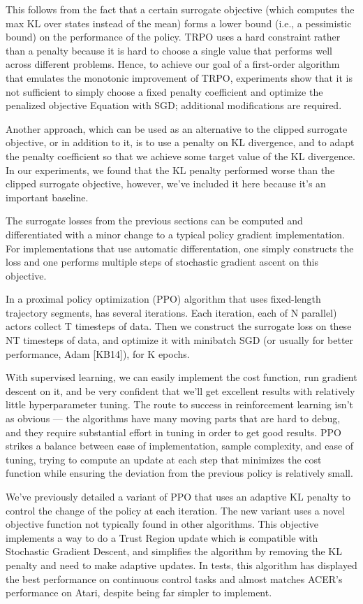 \documentclass[conference]{IEEEtran}
\begin{document}
This follows from the fact that a certain surrogate objective (which computes the max KL over states instead of the mean) forms a lower bound (i.e., a pessimistic bound) on the performance of the policy. TRPO uses a hard constraint rather than a penalty because it is hard to choose a single value that performs well across different problems. Hence, to achieve our goal of a first-order algorithm that emulates the monotonic improvement of TRPO, experiments show that it is not sufficient to simply choose a fixed penalty coefficient and optimize the penalized objective Equation with SGD; additional modifications are required.

Another approach, which can be used as an alternative to the clipped surrogate objective, or in addition to it, is to use a penalty on KL divergence, and to adapt the penalty coefficient so that we achieve some target value of the KL divergence. In our experiments, we found that the KL penalty performed worse than the clipped surrogate objective, however, we’ve included it here because it’s an important baseline.

The surrogate losses from the previous sections can be computed and differentiated with a minor change to a typical policy gradient implementation. For implementations that use automatic differentation, one simply constructs the loss and one performs multiple steps of stochastic gradient ascent on this objective.

In a proximal policy optimization (PPO) algorithm that uses fixed-length trajectory segments, has several iterations. Each iteration, each of N  parallel) actors collect T timesteps of data. Then we construct the surrogate loss on these NT timesteps of data, and optimize it with minibatch SGD (or usually for better performance, Adam [KB14]), for K epochs.

With supervised learning, we can easily implement the cost function, run gradient descent on it, and be very confident that we’ll get excellent results with relatively little hyperparameter tuning. The route to success in reinforcement learning isn’t as obvious — the algorithms have many moving parts that are hard to debug, and they require substantial effort in tuning in order to get good results. PPO strikes a balance between ease of implementation, sample complexity, and ease of tuning, trying to compute an update at each step that minimizes the cost function while ensuring the deviation from the previous policy is relatively small.

We’ve previously detailed a variant of PPO that uses an adaptive KL penalty to control the change of the policy at each iteration. The new variant uses a novel objective function not typically found in other algorithms. This objective implements a way to do a Trust Region update which is compatible with Stochastic Gradient Descent, and simplifies the algorithm by removing the KL penalty and need to make adaptive updates. In tests, this algorithm has displayed the best performance on continuous control tasks and almost matches ACER’s performance on Atari, despite being far simpler to implement.
\end{document}

